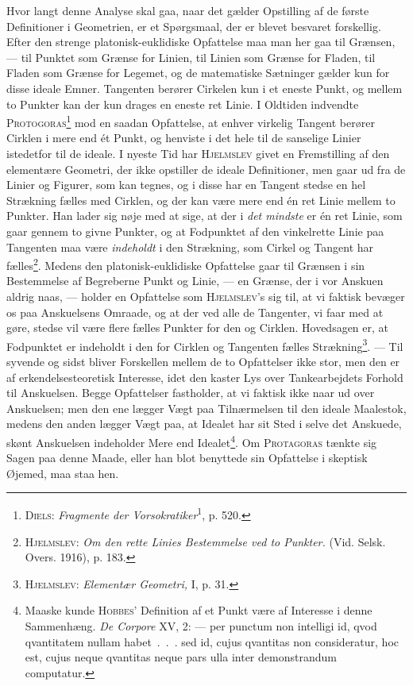 \documentclass[12pt]{article}
\newcommand{\opage}[1]{\marginnote{\footnotesize\textit{[#1]}}}
\begin{document}
Hvor langt denne Analyse skal gaa, naar det gælder Opstilling af de første
Definitioner i Geometrien, er et Spørgsmaal, der er blevet besvaret
forskellig. Efter den strenge platonisk-euklidiske Opfattelse maa man her gaa
til Grænsen, --- til Punktet som Grænse for Linien, til Linien som Grænse for
Fladen, til Fladen som Grænse for Legemet, og de matematiske Sætninger gælder
kun for disse ideale Emner. Tangenten berører Cirkelen kun i et eneste Punkt,
og mellem to Punkter kan der kun drages en eneste ret Linie. I Oldtiden
indvendte \textsc{Protogoras}\footnote{\textsc{Diels}: \textit{Fragmente der
Vorsokratiker}\textsuperscript{1}, p. 520.} mod en saadan Opfattelse, at
enhver virkelig Tangent berører Cirklen i mere end ét Punkt, og henviste i det
hele til de sanselige Linier istedetfor til de ideale. I nyeste Tid har
\textsc{Hjelmslev} givet en Fremstilling af den elementære Geometri, der ikke
opstiller de ideale Definitioner, men gaar ud fra de Linier og Figurer, som kan
tegnes, og i disse har en Tangent stedse en hel Strækning fælles med Cirklen,
og der kan være mere end én ret Linie mellem to Punkter. Han lader sig nøje
med at sige, at der i
\emph{det mindste} er én ret Linie, som gaar gennem to givne Punkter, og at
Fodpunktet af den vinkelrette Linie paa Tangenten maa være \emph{indeholdt} i
den
\setcounter{footnote}{0}%
\opage{42}Strækning, som Cirkel og Tangent har fælles\footnote{\textsc{Hjelmslev}:
\textit{Om den rette Linies Bestemmelse ved to Punkter.} (Vid. Selsk. Overs.
1916), p. 183.}. Medens den platonisk-euklidiske Opfattelse gaar til Grænsen i
sin Bestemmelse af Begreberne Punkt og Linie, --- en Grænse, der i vor
Anskuen aldrig naas, --- holder en Opfattelse som \textsc{Hjelmslev}'s sig til,
at vi faktisk bevæger os paa Anskuelsens Omraade, og at der ved alle de
Tangenter, vi faar med at gøre, stedse vil være flere fælles Punkter for den og
Cirklen. Hovedsagen er, at Fodpunktet er indeholdt i den for Cirklen og
Tangenten fælles Strækning\footnote{\textsc{Hjelmslev}: \textit{Elementær
Geometri,} I, p. 31.}. --- Til syvende og sidst bliver Forskellen mellem de to
Opfattelser ikke stor, men den er af erkendelsesteoretisk Interesse, idet den
kaster Lys over Tankearbejdets Forhold til Anskuelsen. Begge Opfattelser
fastholder, at vi faktisk ikke naar ud over Anskuelsen; men den ene lægger Vægt
paa Tilnærmelsen til den ideale Maalestok, medens den anden lægger Vægt paa, at
Idealet har sit Sted i selve det Anskuede, skønt Anskuelsen indeholder Mere end
Idealet\footnote{Maaske kunde \textsc{Hobbes}' Definition af et Punkt være af
Interesse i denne Sammenhæng. \textit{De Corpore} XV, 2: --- per punctum non
intelligi id, qvod qvantitatem nullam habet~.~.~. sed id, cujus qvantitas non
consideratur, hoc est, cujus neque qvantitas neque pars ulla inter
demonstrandum computatur.}. Om \textsc{Protagoras} tænkte sig Sagen paa denne
Maade, eller han blot benyttede sin Opfattelse i skeptisk Øjemed, maa staa hen.
\end{document}
